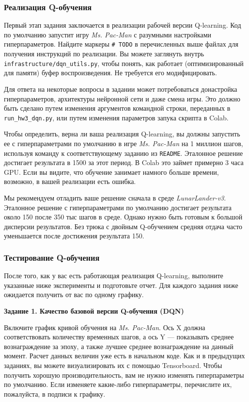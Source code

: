 \documentclass[12pt, oneside]{article}
\begin{document}
\subsubsection{Реализация Q-обучения}

Первый этап задания заключается в реализации рабочей версии Q-learning. Код по умолчанию запустит игру \textit{Ms. Pac-Man} с разумными настройками гиперпараметров. Найдите маркеры \verb|# TODO| в перечисленных выше файлах для получения инструкций по реализации. Вы можете заглянуть внутрь \verb|infrastructure/dqn_utils.py|, чтобы понять, как работает (оптимизированный для памяти) буфер воспроизведения. Не требуется его модифицировать.

Для ответа на некоторые вопросы в задании может потребоваться донастройка гиперпараметров, архитектуры нейронной сети и даже смена игры. Это должно быть сделано путем изменения аргументов командной строки, переданных в \verb|run_hw3_dqn.py|, или путем изменения параметров запука скрипта в Colab.

Чтобы определить, верна ли ваша реализация Q-learning, вы должны запустить ее с гиперпараметрами по умолчанию в игре \textit{Ms. Pac-Man} на 1 миллион шагов, используя команду к соответствующему заданию из \verb|README|. Эталонное решение достигает результата в 1500 за этот период. В Colab это займет примерно 3 часа GPU. Если вы видите, что обучение занимает намного больше времени, возможно, в вашей реализации есть ошибка.

Мы рекомендуем отладить ваше решение сначала в среде \textit{LunarLander-v3}. Эталонное решение с гиперпараметрами по умолчанию достигает результата около 150 после 350 тыс шагов в среде. Однако нужно быть готовым к большой дисперсии результатов. Без трюка с двойным Q-обучением средняя отдача часто уменьшается после достижения результата 150.

\subsubsection{Тестирование Q-обучения}

После того, как у вас есть работающая реализация Q-learning, выполните указанные ниже эксперименты и подготовьте отчет. Для каждого задания ниже ожидается получить от вас по одному графику.

\textbf{Задание 1. Качество базовой версии Q-обучения (DQN)}

Включите график кривой обучения на \textit{Ms. Pac-Man}. Ось X должна соответствовать количеству временных шагов, а ось Y --- показывать среднее вознаграждение за эпоху, а также лучшее среднее вознаграждение на данный момент. Расчет данных величин уже есть в начальном коде. Как и в предыдущих заданиях, вы можете визуализировать их с помощью Tensorboard. Чтобы получить хорошую производительность, вам не нужно изменять гиперпараметры по умолчанию. Если изменяете какие-либо гиперпараметры, перечислите их, пожалуйста, в подписи к графику.
\end{document}

